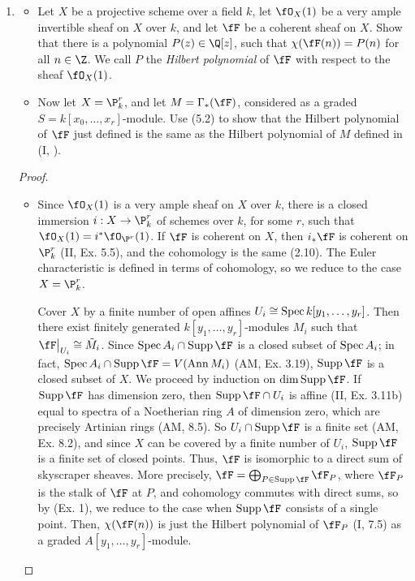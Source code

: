 \documentclass[a4paper]{article}
\begin{document}
\begin{enumerate} [label=\textbf{\arabic*.}, leftmargin=0em]
  \item \begin{itemize}
          \item[(a)] Let $X$ be a projective scheme over a field $k$, let $\fO_X(1)$ be a very ample invertible sheaf on $X$ over $k$, and let $\fF$ be a coherent sheaf on $X$.
                Show that there is a polynomial $P(z) \in \Q[z]$, such that $\chi(\fF(n)) = P(n)$ for all $n \in \Z$. We call $P$ the \textit{Hilbert polynomial} of $\fF$ with respect to the sheaf $\fO_X(1)$.
          \item[(b)] Now let $X = \P_k^r$, and let $M = \Gamma_*(\fF)$, considered as a graded $S = k[x_0, \dots, x_r]$-module. Use (5.2) to show that the Hilbert polynomial of $\fF$ just defined is the same as the Hilbert polynomial of $M$ defined in (I, ).
        \end{itemize}

        \begin{proof} $ $ \vspace{0pt}
          \begin{itemize} [leftmargin=0cm]
            \item[(a)] Since $\fO_X(1)$ is a very ample sheaf on $X$ over $k$, there is a closed immersion $i : X \to \P_k^r$ of schemes over $k$, for some $r$, such that $\fO_X(1) = i^* \fO_{\P^r}(1)$.
                  If $\fF$ is coherent on $X$, then $i_* \fF$ is coherent on $\P_k^r$ (II, Ex. 5.5), and the cohomology is the same (2.10).
                  The Euler characteristic is defined in terms of cohomology, so we reduce to the case $X = \P_k^r$.

                  Cover $X$ by a finite number of open affines $U_i \cong \operatorname{Spec}{k[y_1, \dots, y_r]}$.
                  Then there exist finitely generated $k[y_1, \dots, y_r]$-modules $M_i$ such that $\restr{\fF}{U_i} \cong \tilde{M}_i$.
                  Since $\spec{A_i} \cap \supp{\fF}$ is a closed subset of $\operatorname{Spec}{A_i}$; in fact, $\spec{A_i} \cap \supp{\fF} = V(\Ann{M_i})$ (AM, Ex. 3.19), $\supp{\fF}$ is a closed subset of $X$.
                  We proceed by induction on $\dim{\supp{\fF}}$.
                  If $\Supp{\fF}$ has dimension zero, then $\Supp{\fF} \cap U_i$ is affine (II, Ex. 3.11b) equal to spectra of a Noetherian ring $A$ of dimension zero, which are precisely Artinian rings (AM, 8.5).
                  So $U_i \cap \Supp{\fF}$ is a finite set (AM, Ex. 8.2), and since $X$ can be covered by a finite number of $U_i$, $\Supp{\fF}$ is a finite set of closed points.
                  Thus, $\fF$ is isomorphic to a direct sum of skyscraper sheaves.
                  More precisely, $\fF = \bigoplus_{P \in \Supp{\fF}} \fF_P$, where $\fF_P$ is the stalk of $\fF$ at $P$, and cohomology commutes with direct sums, so by (Ex. 1), we reduce to the case when $\Supp{\fF}$ consists of a single point.
                  Then, $\chi(\fF(n))$ is just the Hilbert polynomial of $\fF_P$ (I, 7.5) as a graded $A[y_1, \dots, y_r]$-module.


\end{itemize}
\end{proof}
\end{enumerate}
\end{document}
